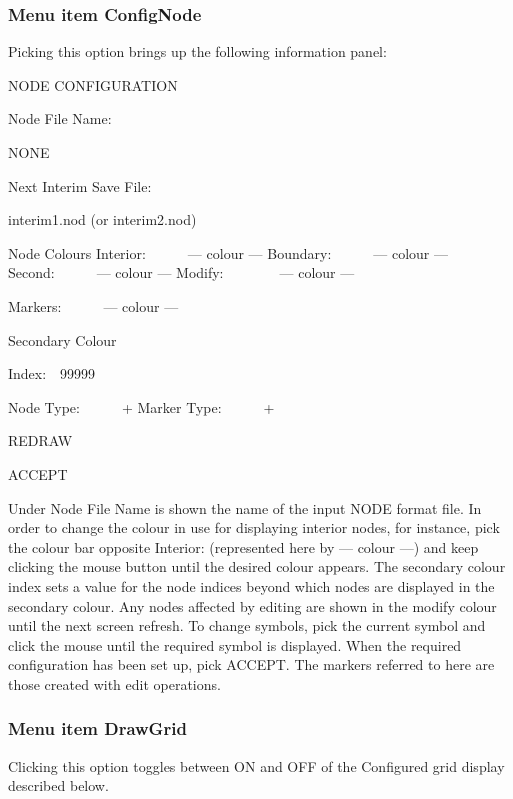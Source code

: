 \documentclass{article}
\begin{document}
\subsubsection[Menu item ConfigNode]{Menu item ConfigNode}
Picking this option brings up the following information panel:

NODE CONFIGURATION

Node File Name:\ \ \ \ 

NONE \newline


Next Interim Save File:\ \ \ \ 

interim1.nod (or interim2.nod)


\bigskip

Node Colours\newline
Interior:\ \ \ \ \ \ {}--- colour ---\newline
Boundary:\ \ \ \ \ \ {}--- colour ---\newline
Second:\ \ \ \ \ \ {}--- colour ---\newline
Modify:\ \ \ \ \ \ \ \ {}--- colour ---

Markers:\ \ \ \ \ \ {}--- colour ---


\bigskip

Secondary Colour 

Index:\ \ 99999


\bigskip

Node Type:\ \ \ \ \ \ +\newline
Marker Type:\ \ \ \ \ \ +

REDRAW

ACCEPT


\bigskip

Under {\textquotedbl} Node File Name{\textquotedbl} is shown the name of the input NODE format file. In order to change the colour in use for displaying interior nodes, for instance, pick the colour bar opposite Interior: (represented here by --- colour ---) and keep clicking the mouse button until the desired colour appears. The secondary colour index sets a value for the node indices beyond which nodes are displayed in the secondary colour. Any nodes affected by editing are shown in the {\textquotedbl}modify{\textquotedbl} colour until the next screen refresh. To change symbols, pick the current symbol and click the mouse until the required symbol is displayed. When the required configuration has been set up, pick ACCEPT. The markers referred to here are those created with edit operations.

\subsubsection[Menu item DrawGrid]{Menu item DrawGrid}
Clicking this option toggles between ON and OFF of the Configured grid display described below.
\end{document}

